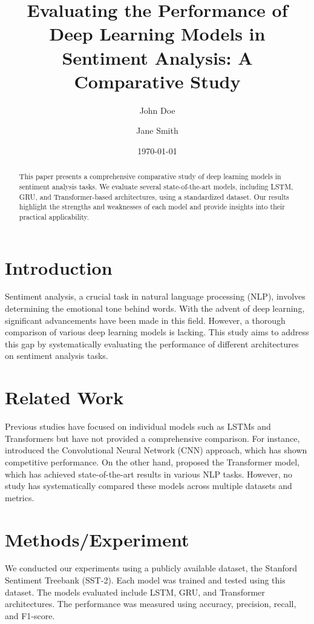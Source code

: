 \documentclass{article}
\title{Evaluating the Performance of Deep Learning Models in Sentiment Analysis: A Comparative Study}
\author{John Doe \and Jane Smith}
\date{\today}
\begin{document}
\maketitle

\begin{abstract}
This paper presents a comprehensive comparative study of deep learning models in sentiment analysis tasks. We evaluate several state-of-the-art models, including LSTM, GRU, and Transformer-based architectures, using a standardized dataset. Our results highlight the strengths and weaknesses of each model and provide insights into their practical applicability.
\end{abstract}

\section{Introduction}
Sentiment analysis, a crucial task in natural language processing (NLP), involves determining the emotional tone behind words. With the advent of deep learning, significant advancements have been made in this field. However, a thorough comparison of various deep learning models is lacking. This study aims to address this gap by systematically evaluating the performance of different architectures on sentiment analysis tasks.

\section{Related Work}
Previous studies have focused on individual models such as LSTMs and Transformers but have not provided a comprehensive comparison. For instance, \cite{kim2014convolutional} introduced the Convolutional Neural Network (CNN) approach, which has shown competitive performance. On the other hand, \cite{vaswani2017attention} proposed the Transformer model, which has achieved state-of-the-art results in various NLP tasks. However, no study has systematically compared these models across multiple datasets and metrics.

\section{Methods/Experiment}
We conducted our experiments using a publicly available dataset, the Stanford Sentiment Treebank (SST-2). Each model was trained and tested using this dataset. The models evaluated include LSTM, GRU, and Transformer architectures. The performance was measured using accuracy, precision, recall, and F1-score.
\end{document}
